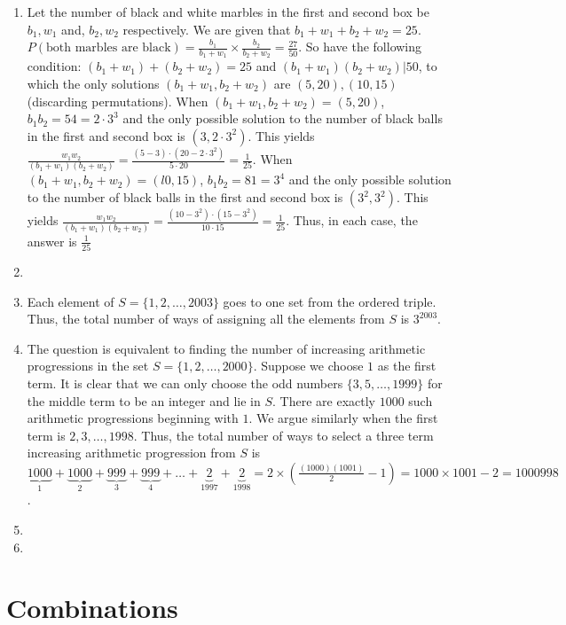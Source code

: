 \documentclass{book}
\begin{document}
\begin{enumerate}[label={1.\arabic*}]
\item
Let the number of black and white marbles in the first and second box be
$b_1, w_1$ and, $b_2, w_2$ respectively. We are given that $b_1 + w_1 +
b_2 + w_2 = 25$. $P(\text{both marbles are black}) = \frac{b_1}{b_1+w_1}
\times \frac{b_2}{b_2+w_2} = \frac{27}{50}$. So have the following
condition: $(b_1+w_1)+(b_2+w_2)=25$ and $(b_1+w_1)(b_2+w_2)|50$, to
which the only solutions $(b_1+w_1,b_2+w_2)$ are $(5,20), (10,15)$
(discarding permutations). When $(b_1+w_1,b_2+w_2)=(5,20)$,
$b_1b_2=54=2\cdot3^3$ and the only possible solution to the number of
black balls in the first and second box is $(3,2\cdot3^2)$. This yields
$\frac{w_1w_2}{(b_1+w_1)(b_2+w_2)}=\frac{(5-3)\cdot(20-2\cdot3^2)}{5\cdot20}=\frac{1}{25}$.
When $(b_1+w_1,b_2+w_2)=(l0,15)$, $b_1b_2=81=3^4$ and the only possible
solution to the number of black balls in the first and second box is
$(3^2,3^2)$. This yields $\frac{w_1w_2}{(b_1+w_1)(b_2+w_2)} =
\frac{(10-3^2)\cdot(15-3^2)}{10\cdot15} = \frac{1}{25}$. Thus, in each
case, the answer is $\frac{1}{25}$


\item

\item
Each element of $S=\{1, 2, \dots, 2003\}$ goes to one set from the ordered
triple. Thus, the total number of ways of assigning all the elements
from $S$ is $3^{2003}$.

\item
The question is equivalent to finding the number of increasing
arithmetic progressions in the set $S=\{1, 2, \dots, 2000\}$.  Suppose
we choose $1$ as the first term. It is clear that we can only choose the
odd numbers $\{3, 5, \dots, 1999\}$ for the middle term to be an integer
and lie in $S$.  There are exactly $1000$ such arithmetic progressions
beginning with $1$.  We argue similarly when the first term is $2, 3,
\dots, 1998$. Thus, the total number of ways to select a three term
increasing arithmetic progression from $S$ is $\underbrace{1000}_{1} +
\underbrace{1000}_{2} + \underbrace{999}_{3} + \underbrace{999}_{4} +
\dots + \underbrace{2}_{1997} + \underbrace{2}_{1998} =
2\times\left(\frac{(1000)(1001)}{2}-1\right) = 1000\times1001-2 =
1000998$.

\item

\item
\end{enumerate}

\chapter{Combinations}
\end{document}
